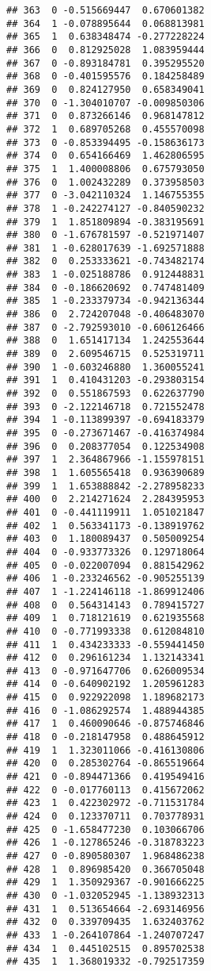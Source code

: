\documentclass[
]{article}
\begin{document}
\begin{verbatim}
## 363  0 -0.515669447  0.670601382
## 364  1 -0.078895644  0.068813981
## 365  1  0.638348474 -0.277228224
## 366  0  0.812925028  1.083959444
## 367  0 -0.893184781  0.395295520
## 368  0 -0.401595576  0.184258489
## 369  0  0.824127950  0.658349041
## 370  0 -1.304010707 -0.009850306
## 371  0  0.873266146  0.968147812
## 372  1  0.689705268  0.455570098
## 373  0 -0.853394495 -0.158636173
## 374  0  0.654166469  1.462806595
## 375  1  1.400008806  0.675793050
## 376  0  1.002432289  0.373958503
## 377  0 -3.042110324  1.146755355
## 378  1 -0.242274127 -0.840590232
## 379  1  1.851809894 -0.383195691
## 380  0 -1.676781597 -0.521971407
## 381  1 -0.628017639 -1.692571888
## 382  0  0.253333621 -0.743482174
## 383  1 -0.025188786  0.912448831
## 384  0 -0.186620692  0.747481409
## 385  1 -0.233379734 -0.942136344
## 386  0  2.724207048 -0.406483070
## 387  0 -2.792593010 -0.606126466
## 388  0  1.651417134  1.242553644
## 389  0  2.609546715  0.525319711
## 390  1 -0.603246880  1.360055241
## 391  1  0.410431203 -0.293803154
## 392  0  0.551867593  0.622637790
## 393  0 -2.122146718  0.721552478
## 394  1 -0.113899397 -0.694183379
## 395  0 -0.273671467 -0.416374984
## 396  0  0.208377054  0.122534908
## 397  1  2.364867966 -1.155978151
## 398  1  1.605565418  0.936390689
## 399  1  1.653888842 -2.278958233
## 400  0  2.214271624  2.284395953
## 401  0 -0.441119911  1.051021847
## 402  1  0.563341173 -0.138919762
## 403  0  1.180089437  0.505009254
## 404  0 -0.933773326  0.129718064
## 405  0 -0.022007094  0.881542962
## 406  1 -0.233246562 -0.905255139
## 407  1 -1.224146118 -1.869912406
## 408  0  0.564314143  0.789415727
## 409  1  0.718121619  0.621935568
## 410  0 -0.771993338  0.612084810
## 411  1  0.434233333 -0.559441450
## 412  0  0.296161234  1.132143341
## 413  0 -0.971647706  0.626009534
## 414  0 -0.640902192  1.205961283
## 415  0  0.922922098  1.189682173
## 416  0 -1.086292574  1.488944385
## 417  1  0.460090646 -0.875746846
## 418  0 -0.218147958  0.488645912
## 419  1  1.323011066 -0.416130806
## 420  0  0.285302764 -0.865519664
## 421  0 -0.894471366  0.419549416
## 422  0 -0.017760113  0.415672062
## 423  1  0.422302972 -0.711531784
## 424  0  0.123370711  0.703778931
## 425  0 -1.658477230  0.103066706
## 426  1 -0.127865246 -0.318783223
## 427  0 -0.890580307  1.968486238
## 428  1  0.896985420  0.366705048
## 429  1  1.350929367 -0.901666225
## 430  0 -1.032052945 -1.138932313
## 431  1  0.513654664 -2.693146956
## 432  0  0.339709435  1.632403762
## 433  1 -0.264107864 -1.240707247
## 434  1  0.445102515  0.895702538
## 435  1  1.368019332 -0.792517359

\end{verbatim}
\end{document}
